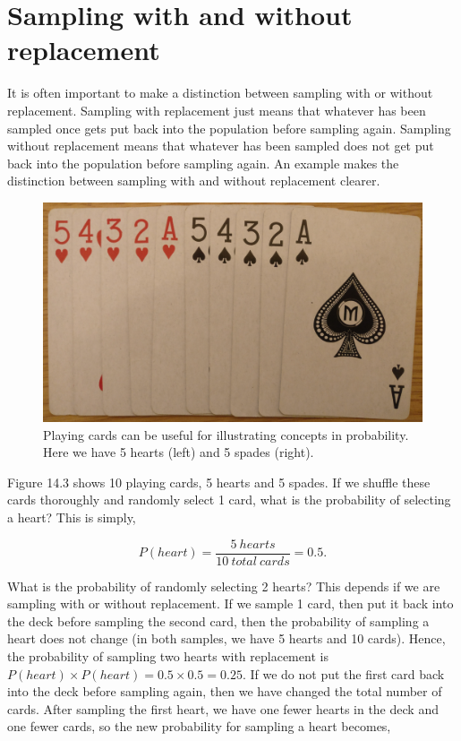 \documentclass[
]{scrbook}
\begin{document}
\hypertarget{sampling-with-and-without-replacement}{%
\section{Sampling with and without replacement}\label{sampling-with-and-without-replacement}}

It is often important to make a distinction between sampling with or without replacement.
Sampling with replacement just means that whatever has been sampled once gets put back into the population before sampling again.
Sampling without replacement means that whatever has been sampled does not get put back into the population before sampling again.
An example makes the distinction between sampling with and without replacement clearer.

\begin{figure}
\includegraphics[width=1\linewidth]{img/cards} \caption{Playing cards can be useful for illustrating concepts in probability. Here we have 5 hearts (left) and 5 spades (right).}\label{fig:unnamed-chunk-52}
\end{figure}

Figure 14.3 shows 10 playing cards, 5 hearts and 5 spades.
If we shuffle these cards thoroughly and randomly select 1 card, what is the probability of selecting a heart?
This is simply,

\[P(heart) = \frac{5\:hearts}{10\:total\:cards} = 0.5.\]

What is the probability of randomly selecting 2 hearts?
This depends if we are sampling with or without replacement.
If we sample 1 card, then put it back into the deck before sampling the second card, then the probability of sampling a heart does not change (in both samples, we have 5 hearts and 10 cards).
Hence, the probability of sampling two hearts with replacement is \(P(heart) \times P(heart) = 0.5 \times 0.5 = 0.25\).
If we do not put the first card back into the deck before sampling again, then we have changed the total number of cards.
After sampling the first heart, we have one fewer hearts in the deck and one fewer cards, so the new probability for sampling a heart becomes,
\end{document}
